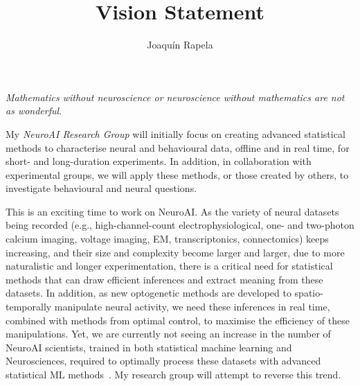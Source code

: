 \documentclass{article}
\title{Vision Statement}
\author{Joaqu\'{i}n Rapela}
\begin{document}

\hfill\textit{Mathematics without neuroscience or neuroscience without mathematics are not as
wonderful}.


My \emph{NeuroAI Research Group} will initially focus on
creating advanced statistical methods to characterise neural and behavioural
data, offline and in real time, for short- and long-duration experiments. In
addition, in collaboration with experimental groups, we will apply these
methods, or those created by others, to investigate behavioural and neural
questions.
%

This is an exciting time to work on NeuroAI. As the variety of neural datasets
being recorded (e.g., high-channel-count electrophysiological, one- and
two-photon calcium imaging, voltage imaging, EM, transcriptonics, connectomics)
keeps increasing, and their size and complexity become larger and larger, due
to more naturalistic and longer experimentation, there is a critical need for
statistical methods that can draw efficient inferences and extract meaning from
these datasets.
%
In addition, as new optogenetic methods are developed to spatio-temporally
manipulate neural activity, we need these inferences in real time, combined
with methods from optimal control, to maximise the efficiency of these
manipulations.
%
Yet, we are currently not seeing an increase in the number of NeuroAI
scientists, trained in both statistical machine learning and Neurosciences,
required to optimally process these datasets with advanced statistical ML
methods~\citep{paninskiAndCunningham18}.
%
My research group will attempt to reverse this trend.
\end{document}
